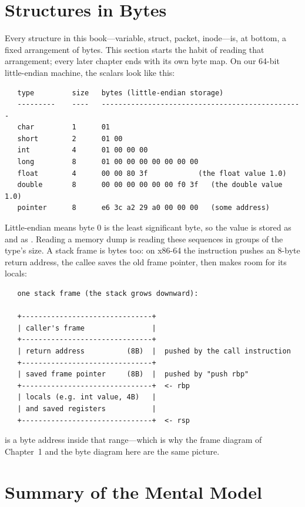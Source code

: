 \section{Structures in Bytes}

Every structure in this book---variable, struct, packet, inode---is,
at bottom, a fixed arrangement of bytes. This section starts the habit
of reading that arrangement; every later chapter ends with its own
byte map. On our 64-bit little-endian machine, the scalars look like
this:

\begin{verbatim}
   type         size   bytes (little-endian storage)
   ---------    ----   ------------------------------------------------
   char         1      01
   short        2      01 00
   int          4      01 00 00 00
   long         8      01 00 00 00 00 00 00 00
   float        4      00 00 80 3f            (the float value 1.0)
   double       8      00 00 00 00 00 00 f0 3f   (the double value 1.0)
   pointer      8      e6 3c a2 29 a0 00 00 00   (some address)
\end{verbatim}

Little-endian means byte 0 is the least significant byte, so the value
 is stored as  and  as
. Reading a memory dump is reading these sequences in
groups of the type's size. A stack frame is bytes too: on x86-64 the
 instruction pushes an 8-byte return address, the callee
saves the old frame pointer, then makes room for its locals:

\begin{verbatim}
   one stack frame (the stack grows downward):

   +-------------------------------+
   | caller's frame                |
   +-------------------------------+
   | return address          (8B)  |  pushed by the call instruction
   +-------------------------------+
   | saved frame pointer     (8B)  |  pushed by "push rbp"
   +-------------------------------+  <- rbp
   | locals (e.g. int value, 4B)   |
   | and saved registers           |
   +-------------------------------+  <- rsp
\end{verbatim}

 is a byte address inside that range---which is why the
frame diagram of Chapter~1 and the byte diagram here are the same
picture.

\section{Summary of the Mental Model}

